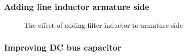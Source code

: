 \documentclass[fleqn, a4paper]{report}
\begin{document}
\subsubsection*{Adding line inductor armature side}
\begin{figure}[H]%
    \centering
    \qquad
    \caption{The effect of adding filter inductor to armature side}%
    \label{fig:example}%
\end{figure}
\subsubsection*{Improving DC bus capacitor}
\end{document}
